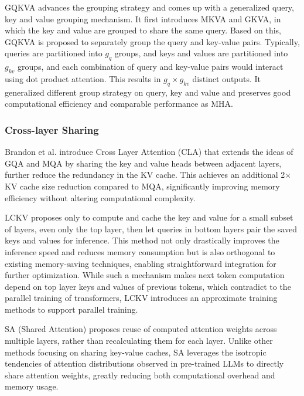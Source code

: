 GQKVA \cite{javadiGQKVAEfficientPretraining2023} advances the grouping strategy and comes up with a generalized query, key and value grouping mechanism. It first introduces MKVA and GKVA, in which the key and value are grouped to share the same query. Based on this, GQKVA is proposed to separately group the query and key-value pairs. Typically, queries are partitioned into \(g_q\) groups, and keys and values are partitioned into \(g_{kv}\) groups, and each combination of query and key-value pairs would interact using dot product attention. This results in \(g_q \times g_{kv}\) distinct outputs. It generalized different group strategy on query, key and value and preserves good computational efficiency and comparable performance as MHA.

\subsubsection{Cross-layer Sharing}\label{sec:model_sharing_cross}

Brandon et al. introduce Cross Layer Attention (CLA) \cite{brandonReducingTransformerKeyValue2024} that extends the ideas of GQA and MQA by sharing the key and value heads between adjacent layers, further reduce the redundancy in the KV cache. This achieves an additional 2\(\times\) KV cache size reduction compared to MQA, significantly improving memory efficiency without altering computational complexity.

LCKV \cite{wuLayerCondensedKVCache2024} proposes only to compute and cache the key and value for a small subset of layers, even only the top layer, then let queries in bottom layers pair the saved keys and values for inference. This method not only drastically improves the inference speed and reduces memory consumption but is also orthogonal to existing memory-saving techniques, enabling straightforward integration for further optimization. While such a mechanism makes next token computation depend on top layer keys and values of previous tokens, which contradict to the parallel training of transformers, LCKV introduces an approximate training methods to support parallel training.

SA (Shared Attention) \cite{liaoKVCachingShared2024} proposes reuse of computed attention weights across multiple layers, rather than recalculating them for each layer. Unlike other methods focusing on sharing key-value caches, SA leverages the isotropic tendencies of attention distributions observed in pre-trained LLMs to directly share attention weights, greatly reducing both computational overhead and memory usage. 

